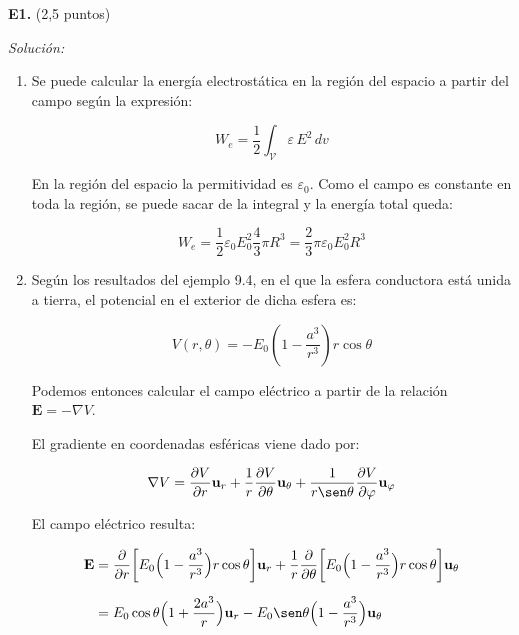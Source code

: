 \textbf{E1.} (2,5 puntos)

\vspace{20px}
\textit{Solución:}
\\

\begin{enumerate}
[label=\alph*)]
    \item Se puede calcular la energía electrostática en la región del espacio a partir del campo según la expresión:

    \begin{equation*}
        W_e = \frac{1}{2} \int_{\mathcal V} \varepsilon \, E^2 \, dv
    \end{equation*}

    En la región del espacio la permitividad es $\varepsilon_0$. Como el campo es constante en toda la región, se puede sacar de la integral y
    la energía total queda:

    \begin{equation*}
        W_e = \frac{1}{2} \varepsilon_0 E_0^2   \frac{4}{3}   \pi    R^3 =  \frac{2}{3}  \pi  \varepsilon_0 E_0^2 R^3
    \end{equation*}

    \vspace{20px}

    \item Según los resultados del ejemplo 9.4, en el que la esfera conductora está unida a tierra, el potencial en el exterior de dicha esfera es:

    \begin{equation*}
        V(r, \theta) = - E_0 ( 1 - \frac{a^3}{r^3})  r  \cos\theta
    \end{equation*}

    Podemos entonces calcular el campo eléctrico a partir de la relación $\textbf{E} = - \nabla V$.

    El gradiente en coordenadas esféricas viene dado por:

    \begin{equation*}
        \nabla V = \frac{\partial V}{\partial r} \textbf{u}_r +
        \frac{1}{r}\frac{\partial V}{\partial \theta} \textbf{u}_\theta +
        \frac{1}{r \sen\theta}\frac{\partial V}{\partial \varphi} \textbf{u}_{\varphi}
    \end{equation*}

    El campo eléctrico resulta:

    \begin{align*}
        \textbf{E} & = \frac{\partial}{\partial r} \biggl[E_0 \Bigl(1 - \frac{a^3}{r^3} \Bigr) r \cos\theta \biggr] \textbf{u}_r +
        \frac{1}{r}\frac{\partial}{\partial \theta} \biggl[E_0 \Bigl(1 - \frac{a^3}{r^3} \Bigr) r \cos\theta \biggr] \textbf{u}_{\theta} \\[6px]
        & = E_0 \cos\theta \Bigl(1 + \frac{2a^3}{r} \Bigr) \textbf{u}_r -
        E_0  \sen\theta\Bigl(1 - \frac{a^3}{r^3} \Bigr)  \textbf{u}_{\theta}
    \end{align*}


\end{enumerate}
